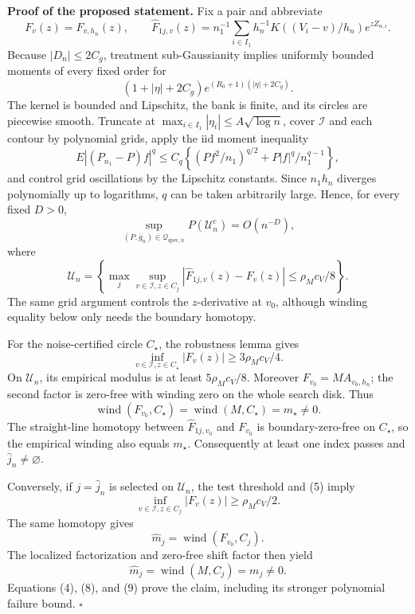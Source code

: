 \textbf{Proof of the proposed statement.}
Fix a pair and abbreviate
\[
 F_v(z)=F_{v,h_n}(z),\qquad
 \widehat F_{1j,v}(z)=n_1^{-1}\sum_{i\in I_1}
 h_n^{-1}K((V_i-v)/h_n)e^{zZ_{n,i}}. \tag{1}
\]
Because \(|D_n|\le2C_g\), treatment sub-Gaussianity implies uniformly bounded moments of every fixed order for
\[
 (1+|\eta|+2C_g)e^{(R_0+1)(|\eta|+2C_g)}. \tag{2}
\]
The kernel is bounded and Lipschitz, the bank is finite, and its circles are piecewise smooth.  Truncate at
\(\max_{i\in I_1}|\eta_i|\le A\sqrt{\log n}\), cover
\(\mathcal I\) and each contour by polynomial grids, apply the iid moment inequality
\[
 E|(P_{n_1}-P)f|^q
 \le C_q\left\{(Pf^2/n_1)^{q/2}
 +P|f|^q/n_1^{q-1}\right\}, \tag{3}
\]
and control grid oscillations by the Lipschitz constants.  Since
\(n_1h_n\) diverges polynomially up to logarithms, \(q\) can be taken arbitrarily large.  Hence, for every fixed \(D>0\),
\[
 \sup_{(P,\bar g_n)\in\mathcal Q_{\mathrm{spec},n}}
 P(\mathcal U_n^c)=O(n^{-D}), \tag{4}
\]
where
\[
 \mathcal U_n=
 \left\{\max_j\sup_{v\in\mathcal I,z\in C_j}
 |\widehat F_{1j,v}(z)-F_v(z)|
 \le\rho_Mc_V/8\right\}. \tag{5}
\]
The same grid argument controls the \(z\)-derivative at \(v_0\), although winding equality below only needs the boundary homotopy.

For the noise-certified circle \(C_\star\), the robustness lemma gives
\[
 \inf_{v\in\mathcal I,z\in C_\star}|F_v(z)|
 \ge3\rho_Mc_V/4. \tag{6}
\]
On \(\mathcal U_n\), its empirical modulus is at least
\(5\rho_Mc_V/8\).  Moreover \(F_{v_0}=MA_{v_0,h_n}\);
the second factor is zero-free with winding zero on the whole search disk.
Thus
\[
 \operatorname{wind}(F_{v_0},C_\star)
 =\operatorname{wind}(M,C_\star)=m_\star\ne0. \tag{7}
\]
The straight-line homotopy between \(\widehat F_{1j,v_0}\) and
\(F_{v_0}\) is boundary-zero-free on \(C_\star\), so the empirical winding also equals \(m_\star\).  Consequently at least one index passes and
\(\widehat j_n\ne\varnothing\).

Conversely, if \(j=\widehat j_n\) is selected on \(\mathcal U_n\), the test threshold and (5) imply
\[
 \inf_{v\in\mathcal I,z\in C_j}|F_v(z)|
 \ge\rho_Mc_V/2. \tag{8}
\]
The same homotopy gives
\[
 \widehat m_j=\operatorname{wind}(F_{v_0},C_j).
\]
The localized factorization and zero-free shift factor then yield
\[
 \widehat m_j=\operatorname{wind}(M,C_j)=m_j\ne0. \tag{9}
\]
Equations (4), (8), and (9) prove the claim, including its stronger polynomial failure bound. \(\square\)